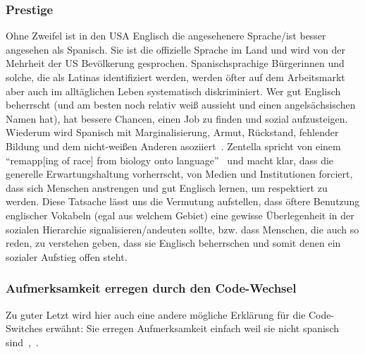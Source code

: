 \subsubsection{Prestige}
Ohne Zweifel ist in den USA Englisch die angesehenere Sprache/ist besser angesehen als Spanisch.
Sie ist die offizielle Sprache im Land und wird von der Mehrheit der US Bevölkerung gesprochen.
Spanischsprachige Bürgerinnen und solche, die als Latinas identifiziert werden, werden öfter auf dem Arbeitsmarkt aber auch im alltäglichen Leben systematisch diskriminiert.
Wer gut Englisch beherrscht (und am besten noch relativ weiß aussieht und einen angelsächsischen Namen hat), hat bessere Chancen, einen Job zu finden und sozial aufzusteigen.
Wiederum wird Spanisch mit Marginalisierung, Armut, Rückstand, fehlender Bildung und dem nicht-weißen Anderen asoziiert~\cite{Zentella07}. %
Zentella spricht von einem ``remapp[ing of race] from biology onto language''~\cite{Zentella07}
und macht klar, dass die generelle Erwartungshaltung vorherrscht, von Medien und Institutionen forciert, dass sich Menschen anstrengen und gut Englisch lernen, um respektiert zu werden.
Diese Tatsache lässt uns die Vermutung aufstellen, dass öftere Benutzung englischer Vokabeln (egal aus welchem Gebiet) eine gewisse Überlegenheit in der sozialen Hierarchie signalisieren/andeuten sollte, bzw. dass Menschen, die auch so reden, zu verstehen geben, dass sie Englisch beherrschen und somit denen ein sozialer Aufstieg offen steht.

\begin{comment}
Genau damit würde ich die Kategorie der englischen Discourse Markers (DE?) erklären.
Sonst ist es kaum nachvollziehbar, warum im Text ``anyway'', ``must'' oder ``pros and contras'' erscheinen sollten, anstatt auf diese komplett zu verzichten, bzw. die spanischen Übersetzungen zu benutzen. %
Bei gesprochener Sprache kann man sich diese Gebrauche noch mit spontanem Ausdruck erklären, bei dem Medium Zeitschrift jedoch, wo die Autorinnen der Artikel Zeit zum Nachdenken hatten und der Text vermutlich einen (mehrstuffigen) Redigierprozess durchlaufen hat, kann von Spontanietät kaum die Rede sein.
\end{comment}

\subsubsection{Aufmerksamkeit erregen durch den Code-Wechsel}
Zu guter Letzt wird hier auch eine andere mögliche Erklärung für die Code-Switches erwähnt:
Sie erregen Aufmerksamkeit einfach weil sie nicht spanisch sind~\cite[]{Mahootian05},~\cite{Lee99}.

